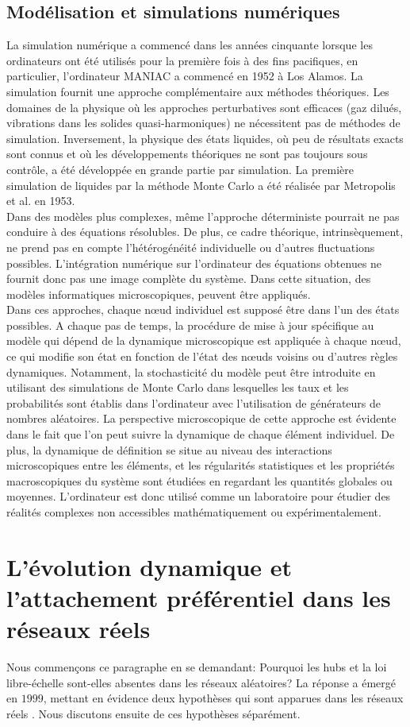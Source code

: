 \subsection{Modélisation et simulations numériques}
La simulation numérique a commencé dans les années cinquante lorsque les ordinateurs ont été utilisés pour la première fois à des fins pacifiques, en particulier, l'ordinateur MANIAC a commencé en 1952 à Los Alamos. La simulation fournit une approche complémentaire aux méthodes théoriques. Les domaines de la physique où les approches perturbatives sont efficaces (gaz dilués, vibrations dans les solides quasi-harmoniques) ne nécessitent pas de méthodes de simulation. Inversement, la physique des états liquides, où peu de résultats exacts sont connus et où les développements théoriques ne sont pas toujours sous contrôle, a été développée en grande partie par simulation. La première simulation de liquides par la méthode Monte Carlo a été réalisée par Metropolis et al. en 1953.\\
Dans des modèles plus complexes, même l'approche déterministe pourrait ne pas conduire à des équations résolubles. De plus, ce cadre théorique, intrinsèquement, ne prend pas en compte l'hétérogénéité individuelle ou d'autres fluctuations possibles. L'intégration numérique sur l'ordinateur des équations obtenues ne fournit donc pas une image complète du système. Dans cette situation, des modèles informatiques microscopiques, peuvent être appliqués.\\
Dans ces approches, chaque nœud individuel est supposé être dans l'un des états possibles. A chaque pas de temps, la procédure de mise à jour spécifique au modèle qui dépend de la dynamique microscopique est appliquée à chaque nœud, ce qui modifie son état en fonction de l'état des nœuds voisins ou d'autres règles dynamiques. Notamment, la stochasticité du modèle peut être introduite en utilisant des simulations de Monte Carlo dans lesquelles les taux et les probabilités sont établis dans l'ordinateur avec l'utilisation de générateurs de nombres aléatoires. La perspective microscopique de cette approche est évidente dans le fait que l'on peut suivre la dynamique de chaque élément individuel. De plus, la dynamique de définition se situe au niveau des interactions microscopiques entre les éléments, et les régularités statistiques et les propriétés macroscopiques du système sont étudiées en regardant les quantités globales ou moyennes. L'ordinateur est donc utilisé comme un laboratoire pour étudier des réalités complexes non accessibles mathématiquement ou expérimentalement.
\begin{sloppypar}
\section{L'évolution dynamique et l'attachement préférentiel  dans les réseaux réels}
\end{sloppypar}
Nous commençons ce paragraphe en se demandant: Pourquoi les hubs et la loi libre-échelle sont-elles absentes dans les réseaux aléatoires? La réponse a émergé en $1999$, mettant en évidence deux hypothèses qui sont apparues dans les réseaux réels \cite{BA1999}. Nous discutons ensuite de ces hypothèses séparément.

